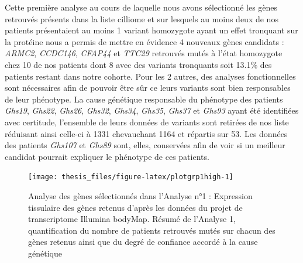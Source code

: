 \documentclass[12pt,twoside]{reedthesis}
\theoremstyle{definition}
\theoremstyle{definition}
\theoremstyle{remark}
\begin{document}
  Cette première analyse au cours de laquelle nous avons sélectionné les
  gènes retrouvés présents dans la liste cilliome et sur lesquels au moins
  deux de nos patients présentaient au moins 1 variant homozygote ayant un
  effet tronquant sur la protéine nous a permis de mettre en évidence 4
  nouveaux gènes candidats : \emph{ARMC2}, \emph{CCDC146}, \emph{CFAP44}
  et \emph{TTC29} retrouvés mutés à l'état homozygote chez 10 de nos
  patients dont 8 avec des variants tronquants soit 13.1\% des patients
  restant dans notre cohorte. Pour les 2 autres, des analyses
  fonctionnelles sont nécessaires afin de pouvoir être sûr ce leurs
  variants sont bien responsables de leur phénotype. La cause génétique
  responsable du phénotype des patients \emph{Ghs19}, \emph{Ghs22},
  \emph{Ghs26}, \emph{Ghs32}, \emph{Ghs34}, \emph{Ghs35}, \emph{Ghs37} et
  \emph{Ghs93} ayant été identifiées avec certitude, l'ensemble de leurs
  données de variants sont retirées de nos liste réduisant ainsi celle-ci
  à 1331 chevauchant 1164 et répartis sur 53. Les données des patients
  \emph{Ghs107} et \emph{Ghs89} sont, elles, conservées afin de voir si un
  meilleur candidat pourrait expliquer le phénotype de ces patients.
  
  \newpage
  
  \begin{figure}
  
  {\centering \texttt{[image: thesis\_files/figure-latex/plotgrp1high-1]} 
  
  }
  
  \caption[Analyse des gènes sélectionnés dans l'Analyse n°1]{Analyse des gènes sélectionnés dans l'Analyse n°1 : Expression tissulaire des gènes retenus d'après les données du projet de transcriptome Illumina bodyMap. Résumé de l'Analyse 1, quantification du nombre de patients retrouvés mutés sur chacun des gènes retenus ainsi que du degré de confiance accordé à la cause génétique}\label{fig:plotgrp1high}
  \end{figure}
  
  \newpage
  
\end{document}
